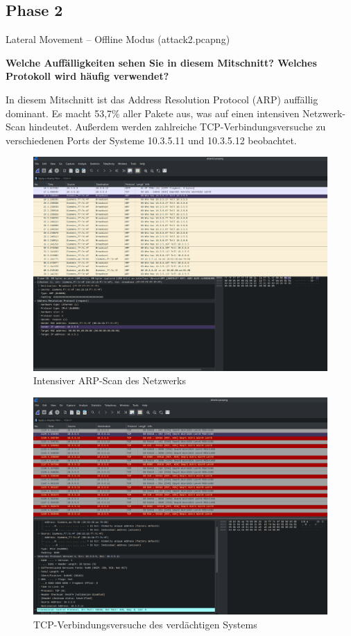 \documentclass[
    a4paper,
    pagesize,
	pdftex,
    12pt,
]{scrartcl}
\begin{document}
\subsection{Phase 2}
Lateral Movement – Offline Modus (attack2.pcapng)

\textbf{Welche Auffälligkeiten sehen Sie in diesem Mitschnitt? Welches Protokoll wird häufig verwendet?}

In diesem Mitschnitt ist das Address Resolution Protocol (ARP) auffällig dominant. Es macht 53,7\% aller Pakete aus, was auf einen intensiven Netzwerk-Scan hindeutet. Außerdem werden zahlreiche TCP-Verbindungsversuche zu verschiedenen Ports der Systeme 10.3.5.11 und 10.3.5.12 beobachtet.

\begin{figure}[H]
    \centering
    \includegraphics[width=\textwidth]{ws-arp-scan.png}
    \caption{Intensiver ARP-Scan des Netzwerks}
    \label{fig:ws-arp-scan}
\end{figure}

\begin{figure}[H]
    \centering
    \includegraphics[width=\textwidth]{ws-port-scan.png}
    \caption{TCP-Verbindungsversuche des verdächtigen Systems}
    \label{fig:ws-arp-scan}
\end{figure}
\end{document}
